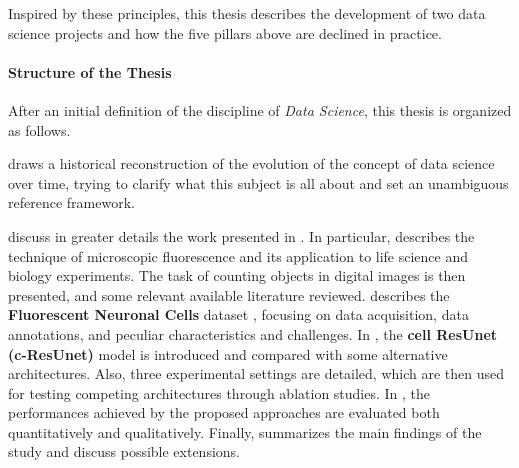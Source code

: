 Inspired by these principles, this thesis describes the development of two data science projects and how the five pillars above are declined in practice.


\paragraph{Structure of the Thesis}

After an initial definition of the discipline of \emph{Data Science}, this thesis is organized as follows.

 draws a historical reconstruction of the evolution of the concept of data science over time, trying to clarify what this subject is all about and set an unambiguous reference framework. 

 discuss in greater details the work presented in . In particular,  describes the technique of microscopic fluorescence and its application to life science and biology experiments. The task of counting objects in digital images is then presented, and some relevant available literature reviewed.
 describes the \textbf{Fluorescent Neuronal Cells} dataset \cite{clissa2021fluocells}, focusing on data acquisition, data annotations, and peculiar characteristics and challenges. 
In , the \textbf{cell ResUnet (c-ResUnet)} \cite{morelli2021cresunet} model is introduced and compared with some alternative architectures. Also, three experimental settings are detailed, which are then used for testing competing architectures through ablation studies.
In , the performances achieved by the proposed approaches are evaluated both quantitatively and qualitatively.
Finally,  summarizes the main findings of the study and discuss possible extensions.



